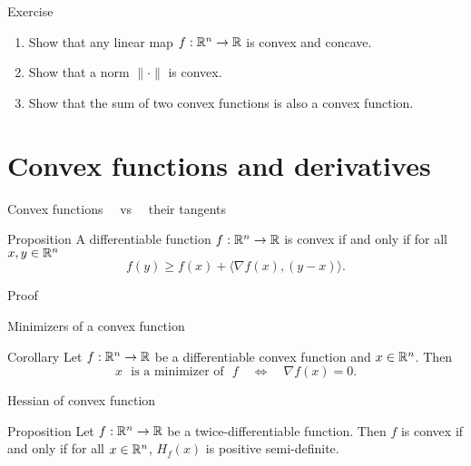 \documentclass{beamer}
\begin{document}
\begin{frame}[t]{Exercise}
	\grid

	\vspace{-0.4cm}

	\begin{enumerate}
		\item Show that any linear map $f:\mathbb{R}^n \to \mathbb{R}$ is convex and concave.
		\item Show that a norm $\| \cdot \|$ is convex.
		\item Show that the sum of two convex functions is also a convex function.
	\end{enumerate}
\end{frame}



\section{Convex functions and derivatives}

\begin{frame}[t]{Convex functions \ \ vs \ \ their tangents}
	\grid

	\vspace{-0.4cm}

	\begin{block}{Proposition}
		A differentiable function $f: \mathbb{R}^n \to \mathbb{R}$ is convex if and only if for all $x,y \in \mathbb{R}^n$
		$$
		f(y) \geq f(x) + \langle \nabla f(x), (y-x) \rangle.
		$$
	\end{block}

\end{frame}
\begin{frame}[t]{Proof}
	\grid

	\pause
\end{frame}


\begin{frame}[t]{Minimizers of a convex function}
	\grid

	\vspace{-0.4cm}

	\begin{block}{Corollary}
	Let $f: \mathbb{R}^n \to \mathbb{R}$ be a differentiable convex function and $x \in \mathbb{R}^n$. Then
	$$
	x \ \ \ \text{is a minimizer of} \ \ \ f
	\quad \Longleftrightarrow \quad \nabla f(x) = 0.
	$$
	\end{block}

\end{frame}

\begin{frame}[t]{Hessian of convex function}
	\grid

	\vspace{-0.4cm}

	\begin{block}{Proposition}
	Let $f: \mathbb{R}^n \to \mathbb{R}$ be a twice-differentiable function. 
	Then $f$ is convex if and only if for all $x \in \mathbb{R}^n$, $H_f(x)$ is positive semi-definite.
	\end{block}

\end{frame}
\end{document}
